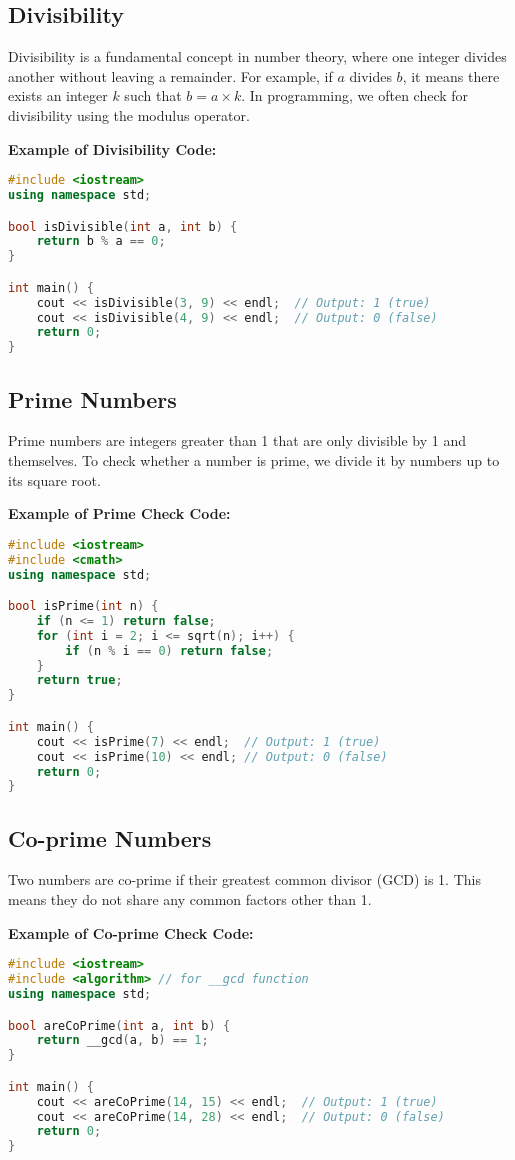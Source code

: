 \documentclass[10pt,a4paper]{article}
\begin{document}
\subsection*{Divisibility}
Divisibility is a fundamental concept in number theory, where one integer divides another without leaving a remainder. For example, if \(a\) divides \(b\), it means there exists an integer \(k\) such that \(b = a \times k\). In programming, we often check for divisibility using the modulus operator.

\textbf{Example of Divisibility Code:}
\begin{lstlisting}[language=C++]
#include <iostream>
using namespace std;

bool isDivisible(int a, int b) {
    return b % a == 0;
}

int main() {
    cout << isDivisible(3, 9) << endl;  // Output: 1 (true)
    cout << isDivisible(4, 9) << endl;  // Output: 0 (false)
    return 0;
}
\end{lstlisting}

\subsection*{Prime Numbers}
Prime numbers are integers greater than 1 that are only divisible by 1 and themselves. To check whether a number is prime, we divide it by numbers up to its square root. 

\textbf{Example of Prime Check Code:}
\begin{lstlisting}[language=C++]
#include <iostream>
#include <cmath>
using namespace std;

bool isPrime(int n) {
    if (n <= 1) return false;
    for (int i = 2; i <= sqrt(n); i++) {
        if (n % i == 0) return false;
    }
    return true;
}

int main() {
    cout << isPrime(7) << endl;  // Output: 1 (true)
    cout << isPrime(10) << endl; // Output: 0 (false)
    return 0;
}
\end{lstlisting}

\subsection*{Co-prime Numbers}
Two numbers are co-prime if their greatest common divisor (GCD) is 1. This means they do not share any common factors other than 1. 

\textbf{Example of Co-prime Check Code:}
\begin{lstlisting}[language=C++]
#include <iostream>
#include <algorithm> // for __gcd function
using namespace std;

bool areCoPrime(int a, int b) {
    return __gcd(a, b) == 1;
}

int main() {
    cout << areCoPrime(14, 15) << endl;  // Output: 1 (true)
    cout << areCoPrime(14, 28) << endl;  // Output: 0 (false)
    return 0;
}
\end{lstlisting}
\end{document}
